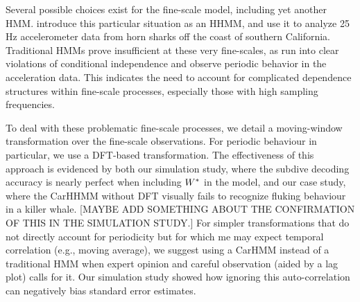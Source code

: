 Several possible choices exist for the fine-scale model, including yet another HMM. \citet{Barajas:2017} introduce this particular situation as an HHMM, and \citet{Adam:2019} use it to analyze 25 Hz accelerometer data from horn sharks off the coast of southern California. Traditional HMMs prove insufficient at these very fine-scales, as \citet{Adam:2019} run into clear violations of conditional independence and observe periodic behavior in the acceleration data. This indicates the need to account for complicated dependence structures within fine-scale processes, especially those with high sampling frequencies. 




To deal with these problematic fine-scale processes, we detail a moving-window transformation over the fine-scale observations. For periodic behaviour in particular, we use a DFT-based transformation. The effectiveness of this approach is evidenced by both our simulation study, where the subdive decoding accuracy is nearly perfect when including $W^*$ in the model, and our case study, where the CarHHMM without DFT visually fails to recognize fluking behaviour in a killer whale. [MAYBE ADD SOMETHING ABOUT THE CONFIRMATION OF THIS IN THE SIMULATION STUDY.] For simpler transformations that do not directly account for periodicity but for which me may expect temporal correlation (e.g., moving average), we suggest using a CarHMM instead of a traditional HMM when expert opinion and careful observation (aided by a lag plot) calls for it. Our simulation study showed how ignoring this auto-correlation can negatively bias standard error estimates. 

